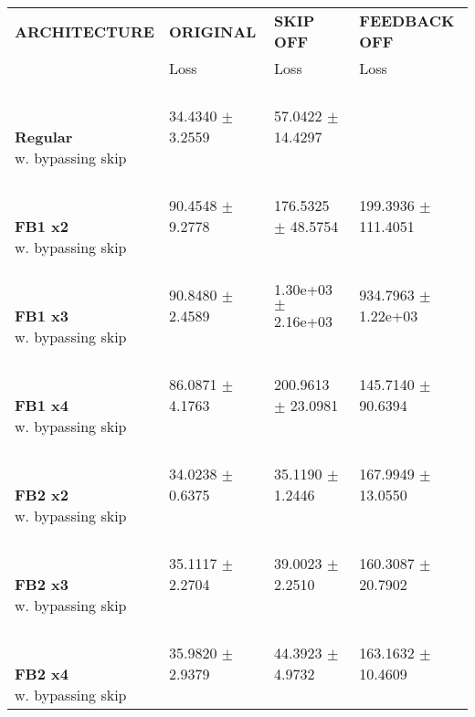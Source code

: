 
\begin{table}[ht]
    \centering
    \begin{tabular}{|>{\columncolor{gray!05}}l|l|l|l|}
        \hline
        \rowcolor{white}
        \textbf{\footnotesize ARCHITECTURE} & \textbf{\footnotesize ORIGINAL} & \textbf{\footnotesize SKIP OFF} & \textbf{\footnotesize FEEDBACK OFF} \\

        \rowcolor{white}
        & {\footnotesize Loss} & {\footnotesize Loss} & {\footnotesize Loss} \\
        \hline
\shortstack[l]{\\ {} \\ \textbf{Regular}\\{w. bypassing skip}} & 34.4340 $\pm$ 3.2559 & 57.0422 $\pm$ 14.4297 &  \\
 \hline 
\shortstack[l]{\\ {} \\ \textbf{FB1 x2}\\{w. bypassing skip}} & 90.4548 $\pm$ 9.2778 & 176.5325 $\pm$ 48.5754 & 199.3936 $\pm$ 111.4051 \\
 \hline 
\shortstack[l]{\\ {} \\ \textbf{FB1 x3}\\{w. bypassing skip}} & 90.8480 $\pm$ 2.4589 & 1.30e+03 $\pm$ 2.16e+03 & 934.7963 $\pm$ 1.22e+03 \\
 \hline 
\shortstack[l]{\\ {} \\ \textbf{FB1 x4}\\{w. bypassing skip}} & 86.0871 $\pm$ 4.1763 & 200.9613 $\pm$ 23.0981 & 145.7140 $\pm$ 90.6394 \\
 \hline 
\shortstack[l]{\\ {} \\ \textbf{FB2 x2}\\{w. bypassing skip}} & 34.0238 $\pm$ 0.6375 & 35.1190 $\pm$ 1.2446 & 167.9949 $\pm$ 13.0550 \\
 \hline 
\shortstack[l]{\\ {} \\ \textbf{FB2 x3}\\{w. bypassing skip}} & 35.1117 $\pm$ 2.2704 & 39.0023 $\pm$ 2.2510 & 160.3087 $\pm$ 20.7902 \\
 \hline 
\shortstack[l]{\\ {} \\ \textbf{FB2 x4}\\{w. bypassing skip}} & 35.9820 $\pm$ 2.9379 & 44.3923 $\pm$ 4.9732 & 163.1632 $\pm$ 10.4609 \\

\end{tabular}
\end{table}

